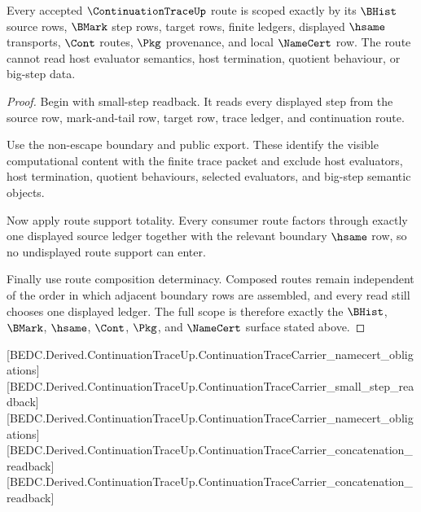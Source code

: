 \begin{theorem}
\label{thm:continuation-trace-scoped-readback}
Every accepted $\ContinuationTraceUp$ route is scoped exactly by its $\BHist$ source rows, $\BMark$ step rows, target rows, finite ledgers, displayed $\hsame$ transports, $\Cont$ routes, $\Pkg$ provenance, and local $\NameCert$ row. The route cannot read host evaluator semantics, host termination, quotient behaviour, or big-step data.
\end{theorem}
\begin{proof}
Begin with small-step readback. It reads every displayed step from the source row, mark-and-tail row, target row, trace ledger, and continuation route.

Use the non-escape boundary and public export. These identify the visible computational content with the finite trace packet and exclude host evaluators, host termination, quotient behaviours, selected evaluators, and big-step semantic objects.

Now apply route support totality. Every consumer route factors through exactly one displayed source ledger together with the relevant boundary $\hsame$ row, so no undisplayed route support can enter.

Finally use route composition determinacy. Composed routes remain independent of the order in which adjacent boundary rows are assembled, and every read still chooses one displayed ledger. The full scope is therefore exactly the $\BHist$, $\BMark$, $\hsame$, $\Cont$, $\Pkg$, and $\NameCert$ surface stated above.
\end{proof}

[BEDC.Derived.ContinuationTraceUp.ContinuationTraceCarrier\_namecert\_obligations]
[BEDC.Derived.ContinuationTraceUp.ContinuationTraceCarrier\_small\_step\_readback]
[BEDC.Derived.ContinuationTraceUp.ContinuationTraceCarrier\_namecert\_obligations]
[BEDC.Derived.ContinuationTraceUp.ContinuationTraceCarrier\_concatenation\_readback]
[BEDC.Derived.ContinuationTraceUp.ContinuationTraceCarrier\_concatenation\_readback]

